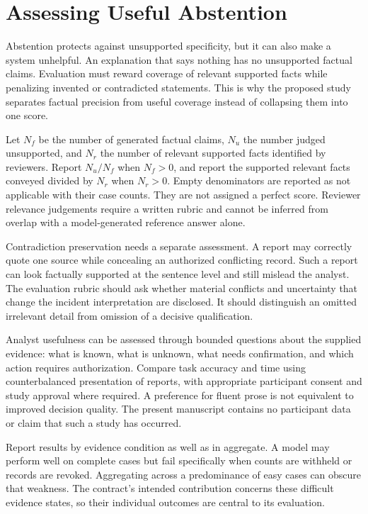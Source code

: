 \section{Assessing Useful Abstention}
Abstention protects against unsupported specificity, but it can also make a system unhelpful. An explanation that says nothing has no unsupported factual claims. Evaluation must reward coverage of relevant supported facts while penalizing invented or contradicted statements. This is why the proposed study separates factual precision from useful coverage instead of collapsing them into one score.

Let $N_f$ be the number of generated factual claims, $N_u$ the number judged unsupported, and $N_r$ the number of relevant supported facts identified by reviewers. Report $N_u/N_f$ when $N_f>0$, and report the supported relevant facts conveyed divided by $N_r$ when $N_r>0$. Empty denominators are reported as not applicable with their case counts. They are not assigned a perfect score. Reviewer relevance judgements require a written rubric and cannot be inferred from overlap with a model-generated reference answer alone.

Contradiction preservation needs a separate assessment. A report may correctly quote one source while concealing an authorized conflicting record. Such a report can look factually supported at the sentence level and still mislead the analyst. The evaluation rubric should ask whether material conflicts and uncertainty that change the incident interpretation are disclosed. It should distinguish an omitted irrelevant detail from omission of a decisive qualification.

Analyst usefulness can be assessed through bounded questions about the supplied evidence: what is known, what is unknown, what needs confirmation, and which action requires authorization. Compare task accuracy and time using counterbalanced presentation of reports, with appropriate participant consent and study approval where required. A preference for fluent prose is not equivalent to improved decision quality. The present manuscript contains no participant data or claim that such a study has occurred.

Report results by evidence condition as well as in aggregate. A model may perform well on complete cases but fail specifically when counts are withheld or records are revoked. Aggregating across a predominance of easy cases can obscure that weakness. The contract's intended contribution concerns these difficult evidence states, so their individual outcomes are central to its evaluation.

